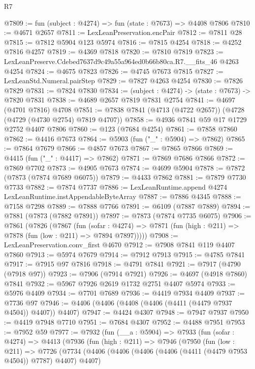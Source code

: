 \begin{lexlean}{R7}
\begin{coremodule}
@7809 := fun (subject : @4274) => fun (state : @7673) => @4408 @7806
@7810 := @4671 @2657
@7811 := LexLeanPreservation.encPair
@7812 := @7811 @28
@7815 := @7812 @5904 @123 @5974
@7816 := @7815 @4254
@7818 := @4252 @7816 @4257
@7819 := @4369 @7818
@7820 := @7810 @7819
@7823 := LexLeanPreserve.Cdebed7637d9c49a55a964ed0b66b80ca.R7.__fits_46 @4263 @4254
@7824 := @4675 @7823
@7826 := @4745 @7673 @7815
@7827 := LexLeanStd.Numeral.pairStep
@7829 := @7827 @4263 @4254
@7830 := @7826 @7829
@7831 := @7824 @7830
@7834 := (subject : @4274) -> (state : @7673) -> @7820 @7831
@7838 := @4689 @2657 @7819 @7831 @2754
@7841 := @4697 (@4701 @7816) @4708
@7851 := @7838 @7841 (@4713 (@4722 @2657)) (@4728 (@4729 (@4730 @2754) @7819 @4707))
@7858 := @4936 @7841 @59 @17 @1729 @2752 @4407 @7806
@7860 := @123 (@7684 @4254)
@7861 := @7858 @7860
@7862 := @4416 @7673
@7864 := @5903 (fun ("_" : @5904) => @7862)
@7865 := @7864 @7679
@7866 := @4857 @7673
@7867 := @7865 @7866
@7869 := @4415 (fun ("_" : @4417) => @7862)
@7871 := @7869 @7686 @7866
@7872 := @7869 @7702
@7873 := @4905 @7673
@7874 := @4699 @5904
@7878 := @7872 (@7873 (@7874 @7689 @6075))
@7879 := @4433 @7862
@7881 := @7879 @7730 @7733
@7882 := @7874 @7737
@7886 := LexLeanRuntime.append @4274 LexLeanRuntime.instAppendableByteArray
@7887 := @7886 @4345
@7888 := @7158 @7298
@7889 := @7888 @7766
@7891 := @6109 (@7887 @7889)
@7894 := @7881 (@7873 (@7882 @7891))
@7897 := @7873 (@7874 @7735 @6075)
@7906 := @7861
    (@7826
      (@7867
        (fun (sofar : @4274) =>
        @7871 (fun (high : @211) => @7878 (fun (low : @211) => @7894 @7897)))))
@7908 := LexLeanPreservation.conv_first @4670
@7912 := @7908 @7841 @119 @4407 @7860
@7913 := @5974 @7679
@7914 := @7912 @7913
@7915 := @4785 @7841
@7917 := @7915 @97 @7816
@7918 := @4791 @7841
@7921 := @7917 (@4790 (@7918 @97))
@7923 := @7906 (@7914 @7921)
@7926 := @4697 (@4918 @7860) @7841
@7932 := @5967 @7926 @2619 @1732 @2751 @4407 @5974
@7933 := @5976 @4409
@7934 := @7701 @7689
@7936 := @4419 @7934 @4409
@7937 := @7736 @97
@7946 := @4406 (@4406 (@4408 (@4406 (@4411 (@4479 @7937 @4504)) @4407)) @4407)
@7947 := @4424 @4307
@7948 := @7947 @7937
@7950 := @4419 @7948 @7710
@7951 := @7684 @4307
@7952 := @4488 @7951
@7953 := @7952 @59
@7977 := @7932
    (fun (__a : @5904) =>
    @7933
      (fun (sofar : @4274) =>
      @4413
        (@7936
          (fun (high : @211) =>
          @7946
            (@7950
              (fun (low : @211) =>
              @7726
                (@7734
                  (@4406
                    (@4406 (@4406 (@4406 (@4411 (@4479 @7953 @4504)) @7787) @4407) @4407)

\end{coremodule}
\end{lexlean}
